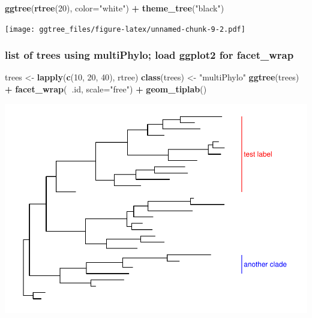 \documentclass[]{article}
\newenvironment{Shaded}{\begin{snugshade}}{\end{snugshade}}
\newcommand{\KeywordTok}[1]{\textcolor[rgb]{0.13,0.29,0.53}{\textbf{#1}}}
\newcommand{\DataTypeTok}[1]{\textcolor[rgb]{0.13,0.29,0.53}{#1}}
\newcommand{\DecValTok}[1]{\textcolor[rgb]{0.00,0.00,0.81}{#1}}
\newcommand{\StringTok}[1]{\textcolor[rgb]{0.31,0.60,0.02}{#1}}
\newcommand{\OperatorTok}[1]{\textcolor[rgb]{0.81,0.36,0.00}{\textbf{#1}}}
\newcommand{\NormalTok}[1]{#1}
\begin{document}
\begin{Shaded}
\begin{Highlighting}[]
\KeywordTok{ggtree}\NormalTok{(}\KeywordTok{rtree}\NormalTok{(}\DecValTok{20}\NormalTok{), }\DataTypeTok{color=}\StringTok{"white"}\NormalTok{) }\OperatorTok{+}\StringTok{ }\KeywordTok{theme_tree}\NormalTok{(}\StringTok{"black"}\NormalTok{)}
\end{Highlighting}
\end{Shaded}

\texttt{[image: ggtree\_files/figure-latex/unnamed-chunk-9-2.pdf]}

\subsubsection{list of trees using multiPhylo; load ggplot2 for
facet\_wrap}\label{list-of-trees-using-multiphylo-load-ggplot2-for-facet_wrap}

\begin{Shaded}
\begin{Highlighting}[]
\NormalTok{trees <-}\StringTok{ }\KeywordTok{lapply}\NormalTok{(}\KeywordTok{c}\NormalTok{(}\DecValTok{10}\NormalTok{, }\DecValTok{20}\NormalTok{, }\DecValTok{40}\NormalTok{), rtree)}
\KeywordTok{class}\NormalTok{(trees) <-}\StringTok{ "multiPhylo"}
\KeywordTok{ggtree}\NormalTok{(trees) }\OperatorTok{+}\StringTok{ }\KeywordTok{facet_wrap}\NormalTok{(}\OperatorTok{~}\NormalTok{.id, }\DataTypeTok{scale=}\StringTok{"free"}\NormalTok{) }\OperatorTok{+}\StringTok{ }\KeywordTok{geom_tiplab}\NormalTok{()}
\end{Highlighting}
\end{Shaded}

\includegraphics{ggtree_files/figure-latex/unnamed-chunk-10-1.pdf}
\end{document}
